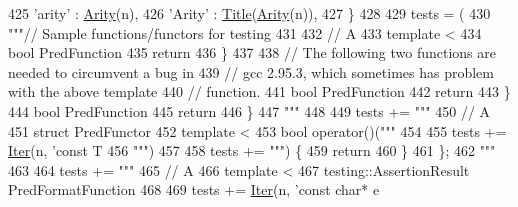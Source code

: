 \begin{DoxyCode}
{{{{{{{{425     \textcolor{stringliteral}{'arity'} : \hyperlink{namespacegen__gtest__pred__impl_a5bbb7272f3588b969ab3ded6f49836a1}{Arity}(n),
426     \textcolor{stringliteral}{'Arity'} : \hyperlink{namespacegen__gtest__pred__impl_ae49dd9bd9152dbcb3ca7994ce04c37ba}{Title}(\hyperlink{namespacegen__gtest__pred__impl_a5bbb7272f3588b969ab3ded6f49836a1}{Arity}(n)),
427     \}
428 
429   tests = (
430 \textcolor{stringliteral}{"""// Sample functions/functors for testing %
431 \textcolor{stringliteral}{}
432 \textcolor{stringliteral}{// A %
433 \textcolor{stringliteral}{template <%
434 \textcolor{stringliteral}{bool PredFunction%
435 \textcolor{stringliteral}{  return %
436 \textcolor{stringliteral}{\}}
437 \textcolor{stringliteral}{}
438 \textcolor{stringliteral}{// The following two functions are needed to circumvent a bug in}
439 \textcolor{stringliteral}{// gcc 2.95.3, which sometimes has problem with the above template}
440 \textcolor{stringliteral}{// function.}
441 \textcolor{stringliteral}{bool PredFunction%
442 \textcolor{stringliteral}{  return %
443 \textcolor{stringliteral}{\}}
444 \textcolor{stringliteral}{bool PredFunction%
445 \textcolor{stringliteral}{  return %
446 \textcolor{stringliteral}{\}}
447 \textcolor{stringliteral}{"""} %
448 
449   tests += \textcolor{stringliteral}{"""}
450 \textcolor{stringliteral}{// A %
451 \textcolor{stringliteral}{struct PredFunctor%
452 \textcolor{stringliteral}{  template <%
453 \textcolor{stringliteral}{  bool operator()("""} %
454 
455   tests += \hyperlink{namespacegen__gtest__pred__impl_ac016218b7c9437d1d5ac85c574c83069}{Iter}(n, \textcolor{stringliteral}{'const T%
456 \textcolor{stringliteral}{                  """})
457 
458   tests += \textcolor{stringliteral}{""") \{}
459 \textcolor{stringliteral}{    return %
460 \textcolor{stringliteral}{  \}}
461 \textcolor{stringliteral}{\};}
462 \textcolor{stringliteral}{"""} %
463 
464   tests += \textcolor{stringliteral}{"""}
465 \textcolor{stringliteral}{// A %
466 \textcolor{stringliteral}{template <%
467 \textcolor{stringliteral}{testing::AssertionResult PredFormatFunction%
468 
469   tests += \hyperlink{namespacegen__gtest__pred__impl_ac016218b7c9437d1d5ac85c574c83069}{Iter}(n, \textcolor{stringliteral}{'const char* e%
}}}}}}}}}}}}}}}}}}}}}}}}}}
\end{DoxyCode}
